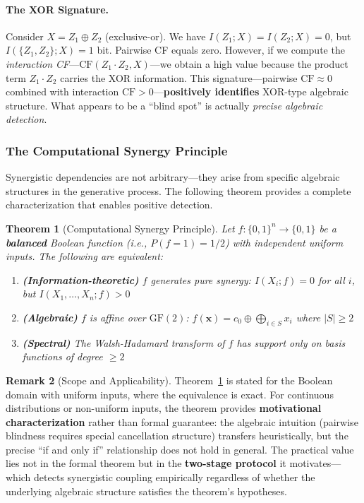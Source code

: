 \documentclass[10pt]{article} %
\theoremstyle{plain}
\newtheorem{theorem}{Theorem}[section]
\theoremstyle{definition}
\newtheorem{remark}[theorem]{Remark}
\newcommand{\CF}{\mathrm{CF}}
\begin{document}
\paragraph{The XOR Signature.} Consider $X = Z_1 \oplus Z_2$ (exclusive-or). We have $I(Z_1; X) = I(Z_2; X) = 0$, but $I(\{Z_1, Z_2\}; X) = 1$ bit. Pairwise CF equals zero. However, if we compute the \emph{interaction CF}---$\CF(Z_1 \cdot Z_2, X)$---we obtain a high value because the product term $Z_1 \cdot Z_2$ carries the XOR information. This signature---pairwise $\CF \approx 0$ combined with interaction $\CF > 0$---\textbf{positively identifies} XOR-type algebraic structure. What appears to be a ``blind spot'' is actually \emph{precise algebraic detection}.

\subsubsection{The Computational Synergy Principle}

Synergistic dependencies are not arbitrary---they arise from specific algebraic structures in the generative process. The following theorem provides a complete characterization that enables positive detection.

\begin{theorem}[Computational Synergy Principle]
\label{thm:synergy}
Let $f : \{0, 1\}^n \to \{0, 1\}$ be a \textbf{balanced} Boolean function (i.e., $P(f=1) = 1/2$) with independent uniform inputs. The following are equivalent:
\begin{enumerate}
    \item \textbf{(Information-theoretic)} $f$ generates pure synergy: $I(X_i; f) = 0$ for all $i$, but $I(X_1, \ldots, X_n; f) > 0$
    \item \textbf{(Algebraic)} $f$ is affine over $\text{GF}(2)$: $f(\mathbf{x}) = c_0 \oplus \bigoplus_{i \in S} x_i$ where $|S| \geq 2$
    \item \textbf{(Spectral)} The Walsh-Hadamard transform of $f$ has support only on basis functions of degree $\geq 2$
\end{enumerate}
\end{theorem}

\begin{remark}[Scope and Applicability]
\label{rem:scope}
Theorem~\ref{thm:synergy} is stated for the Boolean domain with uniform inputs, where the equivalence is exact. For continuous distributions or non-uniform inputs, the theorem provides \textbf{motivational characterization} rather than formal guarantee: the algebraic intuition (pairwise blindness requires special cancellation structure) transfers heuristically, but the precise ``if and only if'' relationship does not hold in general. The practical value lies not in the formal theorem but in the \textbf{two-stage protocol} it motivates---which detects synergistic coupling empirically regardless of whether the underlying algebraic structure satisfies the theorem's hypotheses.
\end{remark}
\end{document}
